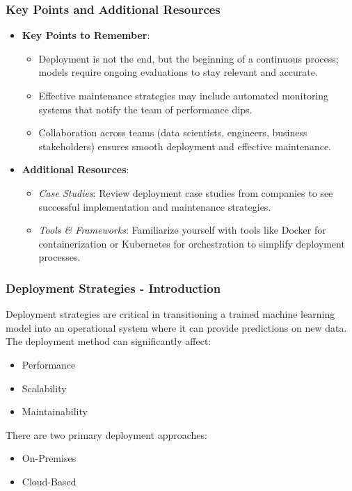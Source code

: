 \documentclass[aspectratio=169]{beamer}
\begin{document}
\begin{frame}[fragile]
    \frametitle{Key Points and Additional Resources}
    \begin{itemize}
        \item \textbf{Key Points to Remember}:
            \begin{itemize}
                \item Deployment is not the end, but the beginning of a continuous process; models require ongoing evaluations to stay relevant and accurate.
                \item Effective maintenance strategies may include automated monitoring systems that notify the team of performance dips.
                \item Collaboration across teams (data scientists, engineers, business stakeholders) ensures smooth deployment and effective maintenance.
            \end{itemize}
        
        \item \textbf{Additional Resources}:
            \begin{itemize}
                \item \textit{Case Studies}: Review deployment case studies from companies to see successful implementation and maintenance strategies.
                \item \textit{Tools \& Frameworks}: Familiarize yourself with tools like Docker for containerization or Kubernetes for orchestration to simplify deployment processes.
            \end{itemize}
    \end{itemize}
\end{frame}

\begin{frame}[fragile]
    \frametitle{Deployment Strategies - Introduction}
    Deployment strategies are critical in transitioning a trained machine learning model into an operational system where it can provide predictions on new data. 
    The deployment method can significantly affect:
    \begin{itemize}
        \item Performance
        \item Scalability
        \item Maintainability
    \end{itemize}
    There are two primary deployment approaches:
    \begin{itemize}
        \item On-Premises
        \item Cloud-Based
    \end{itemize}
\end{frame}
\end{document}
